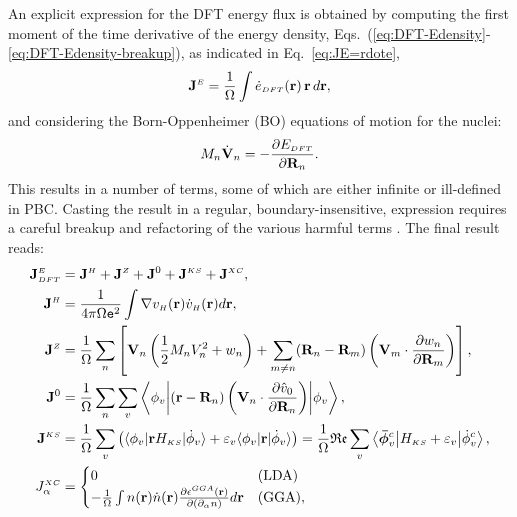An explicit expression for the DFT energy flux is obtained by computing the first moment of the time derivative of the energy density, Eqs.~(\ref{eq:DFT-Edensity}-\ref{eq:DFT-Edensity-breakup}), as indicated in Eq.~\eqref{eq:JE=rdote}, 
\begin{equation}
    \mathbf{J}^{\scriptscriptstyle E} = \frac{1}{{\mathrm\Omega}} \int \dot e_{{\scriptscriptstyle DFT}}(\mathbf{r}) \,\mathbf{r}\, d\mathbf{r} ,
\end{equation}
and considering the Born-Oppenheimer (BO) equations of motion for the nuclei:
\begin{equation}
    M_n \dot{\mathbf{V}}_n = -\frac{\partial E_{{\scriptscriptstyle DFT}}}{\partial \mathbf{R}_n} .
\end{equation}
This results in a number of terms, some of which are either infinite or ill-defined in PBC. Casting the result in a regular, boundary-insensitive, expression requires a careful breakup and refactoring of the various harmful terms \cite{Marcolongo2014,Marcolongo2016}. The final result reads:
\begin{align}
  \allowdisplaybreaks
  \mathbf{J}^\smallE_{\smallDFT}  &=  \mathbf{J}^{\smallH} + \mathbf{J}^{\smallZ} + \mathbf{J}^{0} + \mathbf{J}^{\smallKS} +  \mathbf{J}^{\smallXC}, \label{eq:DFT-Eflux}\\
  \mathbf{J}^{\smallH}  &=  \frac{1}{4\pi \rOmega \mathtt{e}^2}\int \nabla v_{\smallH}(\mathbf r) \dot v_{\smallH}(\mathbf  r) d\mathbf{r}, \\
  \mathbf{J}^{\smallZ}  &=  \frac{1}{\rOmega} \sum_{n}  \left[\mathbf{V}_{n}\left(\frac{1}{2}M_{n}V_{n}^{2} + w_{n}\right) + \sum_{m\ne n}(\mathbf{R}_{n} - \mathbf{R}_{m}) \left(\mathbf{V}_{m} \cdot \frac {\partial w_{n}}{\partial \mathbf{R}_{m}} \right) \right], \label{eq:DFT-ionic}\\
  \mathbf{J}^{0}  &=  \frac{1}{\rOmega}  \sum_{n} \sum_{v}\left\langle \phi_{v} \middle| (\mathbf{r}-\mathbf{R}_{n})\left(\mathbf{V}_{n}\cdot\frac{\partial\hat{v}_{0}}{\partial\mathbf{R}_{n}}\right)\middle| \phi_{v}\right\rangle, \\
  \mathbf{J}^{\smallKS}  &=  \frac{1}{\rOmega} \sum_{v} \left( \langle \phi_v | \mathbf{r} H_{\smallKS} | \dot\phi_v \rangle + \varepsilon_v \langle \phi_v | \mathbf{r} | \dot\phi_v \rangle \right)  =  \frac{1}{\rOmega}  \mathfrak{Re} \sum_{v} \left\langle \bm{\bar \phi}_v^c \middle| H_{\smallKS}+\varepsilon_v \middle| \dot \phi_v^c \right\rangle, \label{eq:DFT-KS}\\
  J_\alpha^{\smallXC}  &=
    \begin{cases}
        0 & \mathrm{(LDA)} \\
        -\frac{1}{\rOmega} \int n(\mathbf{r}) \dot{n}(\mathbf{r}) \frac{\partial\epsilon^{\smallGGA} (\mathbf{r})}{\partial(\partial_\alpha n)} d\mathbf{r} & \mathrm{(GGA)},
    \end{cases}
\end{align}
